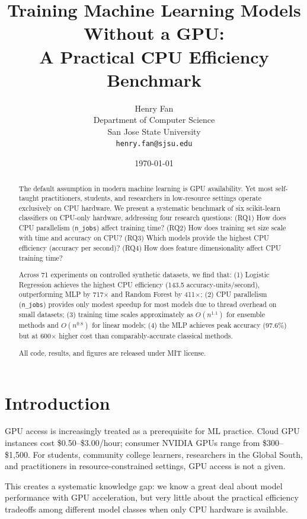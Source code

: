 \documentclass[10pt,twocolumn]{article}
\title{%
  \textbf{Training Machine Learning Models Without a GPU:}\\
  A Practical CPU Efficiency Benchmark
}
\author{%
  Henry Fan \\
  Department of Computer Science \\
  San Jose State University \\
  \texttt{henry.fan@sjsu.edu}
}
\date{\today}
\begin{document}
\maketitle

\begin{abstract}
The default assumption in modern machine learning is GPU availability. 
Yet most self-taught practitioners, students, and researchers in low-resource settings
operate exclusively on CPU hardware.
We present a systematic benchmark of six scikit-learn classifiers on CPU-only hardware, 
addressing four research questions: 
(RQ1) How does CPU parallelism (\texttt{n\_jobs}) affect training time? 
(RQ2) How does training set size scale with time and accuracy on CPU?
(RQ3) Which models provide the highest CPU efficiency (accuracy per second)?
(RQ4) How does feature dimensionality affect CPU training time?

Across 71 experiments on controlled synthetic datasets, we find that:
(1) Logistic Regression achieves the highest CPU efficiency (143.5 accuracy-units/second),
    outperforming MLP by 717$\times$ and Random Forest by 411$\times$;
(2) CPU parallelism (\texttt{n\_jobs}) provides only modest speedup for most models 
    due to thread overhead on small datasets;
(3) training time scales approximately as $O(n^{1.1})$ for ensemble methods 
    and $O(n^{0.8})$ for linear models;
(4) the MLP achieves peak accuracy (97.6\%) but at 600$\times$ higher cost 
    than comparably-accurate classical methods.

All code, results, and figures are released under MIT license.
\end{abstract}

\section{Introduction}

GPU access is increasingly treated as a prerequisite for ML practice. 
Cloud GPU instances cost \$0.50--\$3.00/hour; consumer NVIDIA GPUs range from 
\$300--\$1,500. For students, community college learners, researchers in the 
Global South, and practitioners in resource-constrained settings, 
GPU access is not a given.

This creates a systematic knowledge gap: we know a great deal about model 
performance with GPU acceleration, but very little about the practical efficiency 
tradeoffs among different model classes when only CPU hardware is available.
\end{document}
